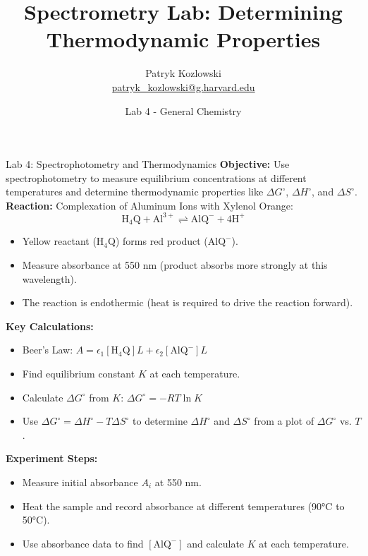 \documentclass{beamer}
\title{Spectrometry Lab: Determining Thermodynamic Properties}
\author{Patryk Kozlowski \\ \href{mailto:patryk_kozlowski@g.harvard.edu}{patryk\_kozlowski@g.harvard.edu}}
\date{Lab 4 - General Chemistry}
\begin{document}
\frame{\titlepage}

\begin{frame}{Lab 4: Spectrophotometry and Thermodynamics}
    \tiny
    \textbf{Objective:} Use spectrophotometry to measure equilibrium concentrations at different temperatures and determine thermodynamic properties like $\Delta G^\circ$, $\Delta H^\circ$, and $\Delta S^\circ$. \\
    
    \pause
    \textbf{Reaction:} Complexation of Aluminum Ions with Xylenol Orange:
    \[
    \text{H}_4\text{Q} + \text{Al}^{3+} \rightleftharpoons \text{AlQ}^{-} + 4\text{H}^{+}
    \]
    \begin{itemize}
        \item Yellow reactant ($\text{H}_4\text{Q}$) forms red product ($\text{AlQ}^{-}$). \pause
        \item Measure absorbance at 550 nm (product absorbs more strongly at this wavelength). \pause
        \item The reaction is endothermic (heat is required to drive the reaction forward). \pause
    \end{itemize}
    
    \textbf{Key Calculations:} \pause
    \begin{itemize}
        \item Beer’s Law: \(A = \epsilon_1[\text{H}_4\text{Q}]L + \epsilon_2[\text{AlQ}^{-}]L\) \pause
        \item Find equilibrium constant \(K\) at each temperature. \pause
        \item Calculate $\Delta G^\circ$ from $K$: \(\Delta G^\circ = -RT \ln K\) \pause
        \item Use $\Delta G^\circ = \Delta H^\circ - T \Delta S^\circ$ to determine $\Delta H^\circ$ and $\Delta S^\circ$ from a plot of $\Delta G^\circ$ vs. $T$. \pause
    \end{itemize}

    \textbf{Experiment Steps:}
    \begin{itemize}
        \item Measure initial absorbance $A_i$ at 550 nm. \pause
        \item Heat the sample and record absorbance at different temperatures (90°C to 50°C). \pause
        \item Use absorbance data to find $[ \text{AlQ}^{-} ]$ and calculate $K$ at each temperature. \pause
    \end{itemize}

\end{frame}
\end{document}
